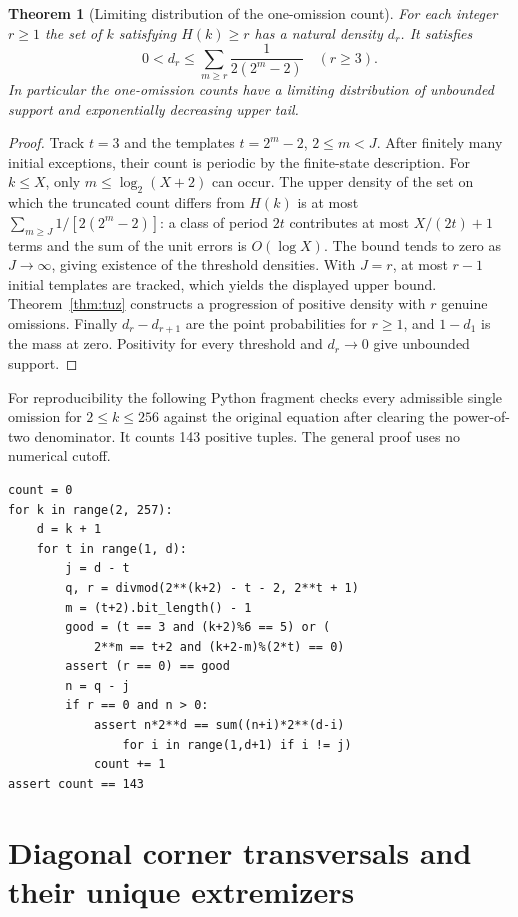 \documentclass[11pt]{article}
\newtheorem{theorem}{Theorem}[section]
\begin{document}
\begin{theorem}[Limiting distribution of the one-omission count]
For each integer $r\ge1$ the set of $k$ satisfying $H(k)\ge r$
has a natural density $d_r$. It satisfies
\[
 0<d_r\le \sum_{m\ge r}\frac{1}{2(2^m-2)}
 \quad (r\ge3).
\]
In particular the one-omission counts have a limiting distribution
of unbounded support and exponentially decreasing upper tail.
\end{theorem}
\begin{proof}
Track $t=3$ and the templates $t=2^m-2$, $2\le m<J$.
After finitely many initial exceptions, their count is periodic by the
finite-state description. For $k\le X$, only $m\le\log_2(X+2)$ can
occur. The upper density of the set on which the truncated count differs
from $H(k)$ is at most $\sum_{m\ge J}1/[2(2^m-2)]$: a class of period
$2t$ contributes at most $X/(2t)+1$ terms and the sum of the unit errors
is $O(\log X)$. The bound tends to zero as $J\to\infty$, giving existence
of the threshold densities. With $J=r$, at most $r-1$ initial templates
are tracked, which yields the displayed upper bound. Theorem~\ref{thm:tuz}
constructs a progression of positive density with $r$ genuine omissions.
Finally $d_r-d_{r+1}$ are the point probabilities for $r\ge1$, and
$1-d_1$ is the mass at zero. Positivity for every threshold and
$d_r\to0$ give unbounded support.
\end{proof}

For reproducibility the following Python fragment checks every admissible
single omission for $2\le k\le256$ against the original equation after
clearing the power-of-two denominator. It counts 143 positive tuples.
The general proof uses no numerical cutoff.
\begin{verbatim}
count = 0
for k in range(2, 257):
    d = k + 1
    for t in range(1, d):
        j = d - t
        q, r = divmod(2**(k+2) - t - 2, 2**t + 1)
        m = (t+2).bit_length() - 1
        good = (t == 3 and (k+2)%6 == 5) or (
            2**m == t+2 and (k+2-m)%(2*t) == 0)
        assert (r == 0) == good
        n = q - j
        if r == 0 and n > 0:
            assert n*2**d == sum((n+i)*2**(d-i)
                for i in range(1,d+1) if i != j)
            count += 1
assert count == 143
\end{verbatim}

\section{Diagonal corner transversals and their unique extremizers}
\label{sec:diagonal-corners}
\end{document}
